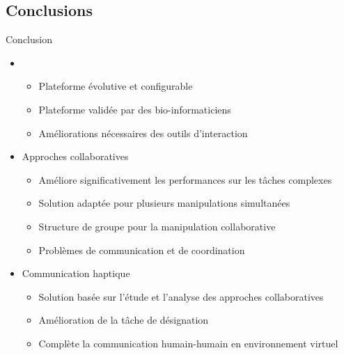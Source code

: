 \documentclass[english,french,dvips,10pt]{mybeamer}
\begin{document}
	\subsection{Conclusions}
	\begin{myframe}{Conclusion}
		\begin{itemize}
				\vfill
			\item \myShaddock
				\begin{itemize}
					\item Plateforme évolutive et configurable
					\item Plateforme validée par des bio-informaticiens
					\item Améliorations nécessaires des outils d'interaction
				\end{itemize}
				\vfill
			\item Approches collaboratives
				\begin{itemize}
					\item Améliore significativement les performances sur les tâches complexes
					\item Solution adaptée pour plusieurs manipulations simultanées
					\item Structure de groupe pour la manipulation collaborative
					\item Problèmes de communication et de coordination
				\end{itemize}
				\vfill
			\item Communication haptique
				\begin{itemize}
					\item Solution basée sur l'étude et l'analyse des approches collaboratives
					\item Amélioration de la tâche de désignation
					\item Complète la communication humain-humain en environnement virtuel
				\end{itemize}
				\vfill
		\end{itemize}
	\end{myframe}
\end{document}
